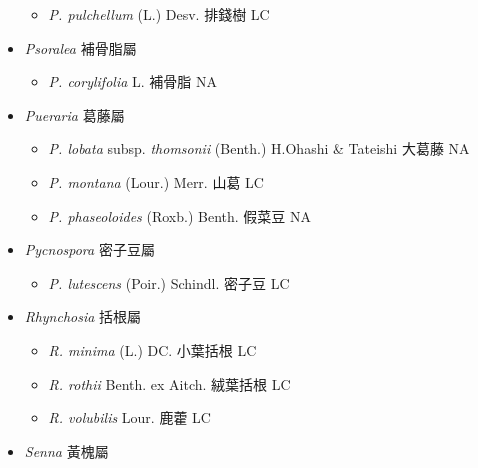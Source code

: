 \begin{itemize}
  \begin{itemize}
        \item[] \textit{P. pulchellum} (L.) Desv.  排錢樹   LC
  \end{itemize}
 \item[] \textit{Psoralea} 補骨脂屬
                                
  \begin{itemize}
        \item[] \textit{P. corylifolia} L.  補骨脂   NA
  \end{itemize}
 \item[] \textit{Pueraria} 葛藤屬
                                
  \begin{itemize}
        \item[] \textit{P. lobata} subsp. \textit{thomsonii} (Benth.) H.Ohashi \& Tateishi  大葛藤   NA
        \item[] \textit{P. montana} (Lour.) Merr.  山葛   LC
        \item[] \textit{P. phaseoloides} (Roxb.) Benth.  假菜豆   NA
  \end{itemize}
 \item[] \textit{Pycnospora} 密子豆屬
                                
  \begin{itemize}
        \item[] \textit{P. lutescens} (Poir.) Schindl.  密子豆   LC
  \end{itemize}
 \item[] \textit{Rhynchosia} 括根屬
                                
  \begin{itemize}
        \item[] \textit{R. minima} (L.) DC.  小葉括根   LC
        \item[] \textit{R. rothii} Benth. ex Aitch.  絨葉括根   LC
        \item[] \textit{R. volubilis} Lour.  鹿藿   LC
  \end{itemize}
 \item[] \textit{Senna} 黃槐屬
                                

\end{itemize}

